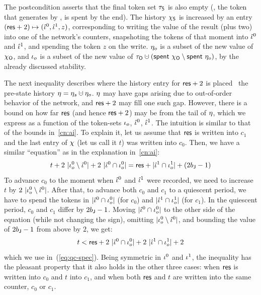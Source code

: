 %

The postcondition asserts that the final token set $\tau_{\mathsf{S}}$ is also
empty (\ie, the token that  generates by ,
is spent by the end). The history $\chi_{\mathsf{S}}$ is increased by an entry
$(\mathsf{res} + 2) \mapsto (\hat{\iota}^0, \hat{\iota}^1, z)$, corresponding to writing the
value of the result (plus two) into one of the network's counters,
snapshoting the tokens of that moment into $\hat{\iota}^0$ and $\hat{\iota}^1$,
and spending the token $z$ on the write. $\eta_o$ is a subset of the
new value of $\chi_{\mathsf{O}}$, and $\iota_o$ is a subset of the new value of
$\tkno \hunion (\Tomb~\histo \setminus \Tomb~\gisto)$, by the already
discussed stability.

The next inequality describes where the history entry for $\mathsf{res} + 2$
is placed \wrt~the pre-state history $\gist = \gists \hunion
\gisto$. $\eta$ may have gaps arising due to out-of-order behavior of
the network, and $\mathsf{res} + 2$ may fill one such gap. However, there is a
bound on how far $\mathsf{res}$ (and hence $\mathsf{res}+2$) may be from the tail of
$\eta$, which we express as a function of the token-sets $\iota_o$,
$\hat{\iota}^0$, $\hat{\iota}^1$. The intuition is similar to that of the bounds
in~\ref{cn:ai}. To explain it, let us assume that $\mathsf{res}$ is written
into $c_1$ and the last entry of $\chi$ (let us call it $t$) was
written into $c_0$. Then, we have a similar ``equation'' as in the
explanation in~\ref{cn:ai}:
\[
t + 2\ |\ikno^0 \setminus \iknh^0| + 2\ |\iknh^0 \cap \ikno^0| = \res
+ |\iknh^1 \cap \ikno^1| + (2 b_\joint -1)
\]
To advance $c_0$ to the moment when $\hat{\iota}^0$ and $\hat{\iota}^1$ were
recorded, we need to increase $t$ by $2\ |\iota_o^0 \setminus
\hat{\iota}^0|$. After that, to advance both $c_0$ and $c_1$ to a quiescent
period, we have to spend the tokens in $|\hat{\iota}^0 \cap \iota_o^0|$ (for
$c_0$) and $|\hat{\iota}^1 \cap \iota_o^1|$ (for $c_1$). In the quiescent
period, $c_0$ and $c_1$ differ by $2 b_{\mathsf{J}} - 1$. Moving $|\hat{\iota}^0
\cap \iota_o^0|$ to the other side of the equation (while not changing
the sign), omitting $|\iota_o^0 \setminus \hat{\iota}^0|$, and bounding the
value of $2 b_{\mathsf{J}} - 1$ from above by $2$, we get:
\[
t < \mathsf{res} + 2\ |\hat{\iota}^0 \cap \iota_o^0| + 2 \ |\hat{\iota}^1 \cap \iota_o^1| + 2
\]
which we use in~(\ref{eq:qc-spec}). Being symmetric in $\iota^0$ and
$\iota^1$, the inequality has the pleasant property that it also holds
in the other three cases: when $\mathsf{res}$ is written into $c_0$ and $t$
into $c_1$, and when both $\mathsf{res}$ and $t$ are written into the same
counter, $c_0$ or $c_1$.

